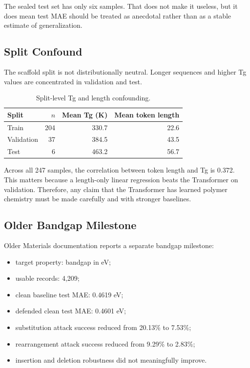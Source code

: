 \documentclass[11pt]{article}
\begin{document}
The sealed test set has only six samples. That does not make it useless, but it
does mean test MAE should be treated as anecdotal rather than as a stable
estimate of generalization.

\subsection{Split Confound}

The scaffold split is not distributionally neutral. Longer sequences and higher
Tg values are concentrated in validation and test.

\begin{table}[H]
\centering
\caption{Split-level Tg and length confounding.}
\begin{tabular}{@{}lrrr@{}}
\toprule
Split & $n$ & Mean Tg (K) & Mean token length \\
\midrule
Train & 204 & 330.7 & 22.6 \\
Validation & 37 & 384.5 & 43.5 \\
Test & 6 & 463.2 & 56.7 \\
\bottomrule
\end{tabular}
\end{table}

Across all 247 samples, the correlation between token length and Tg is 0.372.
This matters because a length-only linear regression beats the Transformer on
validation. Therefore, any claim that the Transformer has learned polymer
chemistry must be made carefully and with stronger baselines.

\subsection{Older Bandgap Milestone}

Older Materials documentation reports a separate bandgap milestone:
\begin{itemize}
  \item target property: bandgap in eV;
  \item usable records: 4,209;
  \item clean baseline test MAE: 0.4619 eV;
  \item defended clean test MAE: 0.4601 eV;
  \item substitution attack success reduced from 20.13\% to 7.53\%;
  \item rearrangement attack success reduced from 9.29\% to 2.83\%;
  \item insertion and deletion robustness did not meaningfully improve.
\end{itemize}
\end{document}
